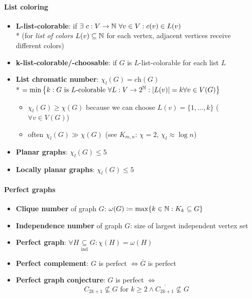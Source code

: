 \paragraph{List coloring}
\begin{itemize}
  \item \textbf{L-list-colorable}: if $ \exists \ c: V \to \mathbb{N} \ \forall v \in V : c(v) \in L(v) $ \\*
  (for \emph{list of colors} $ L(v) \subseteq \mathbb{N} $ for each vertex, adjacent vertices receive different colors) 
  \item \textbf{k-list-colorable/-choosable}: if $ G $ is $ L $-list-colorable for each list $ L $
  \item \textbf{List chromatic number}: $ \chi_l(G) = \text{ch}(G) $ \\* $ = \min\left\{ k : G \text{ is $ L $-colorable } \forall L: V \to 2^{\mathbb{N}}: \vert L(v) \vert = k \forall v \in V(G) \right\} $
  \begin{itemize}
    \item $ \chi_l(G) \geq \chi(G) $ because we can choose $ L(v) = \{ 1, \dots, k \} $ ($ \forall v \in V(G) $) 
    \item often $ \chi_l(G) \gg \chi(G) $ (see $ K_{m,n} $: $ \chi = 2 $, $ \chi_l \approx \log n $)
  \end{itemize}
  \item \textbf{Planar graphs}: $ \chi_l(G) \leq 5 $
  \item \textbf{Locally planar graphs}: $ \chi_l(G) \leq 5 $
\end{itemize}

\paragraph{Perfect graphs}
\begin{itemize}
  \item \textbf{Clique number} of graph $ G $: $ \omega(G) \coloneqq \max\{ k \in \mathbb{N} : K_k \subseteq G \} $
  \item \textbf{Independence number} of graph $ G $: size of largest independent vertex set
  \item \textbf{Perfect graph}: $ \forall H \underset{\text{ind}}{\subseteq} G : \chi(H) = \omega(H) $
  \item \textbf{Perfect complement}: $ G $ is perfect $ \Leftrightarrow \overline{G} $ is perfect
  \item \textbf{Perfect graph conjecture}: $ G $ is perfect $ \Leftrightarrow $
    \begin{equation*}
      C_{2k+1} \not \subseteq G \text{ for } k \geq 2 \wedge \overline{C_{2k+1}} \not \subseteq G
    \end{equation*}
\end{itemize}

